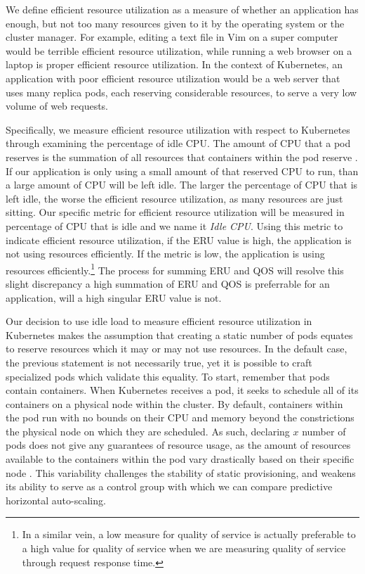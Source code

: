 We define efficient resource utilization as a measure of whether an application
has enough, but not too many resources given to it by the operating system or
the cluster manager. For example, editing a text file in Vim on a super computer
would be terrible efficient resource utilization, while running a web browser on
a laptop is proper efficient resource utilization. In the context of Kubernetes,
an application with poor efficient resource utilization would be a web server
that uses many replica pods, each reserving considerable resources,
to serve a very low volume of web requests.

Specifically, we measure efficient resource utilization with respect to
Kubernetes through examining the percentage of idle CPU.
The amount of CPU that a pod reserves is the summation of
all resources that containers within the pod reserve
\cite{k8s-compute-resources}. If our application is only using a small amount of
that reserved CPU to run, than a large amount of CPU will be left idle. The
larger the percentage of CPU that is left idle, the worse the efficient resource
utilization, as many resources are just sitting. Our specific metric for efficient resource
utilization will be measured in percentage of CPU that is idle and we name it
\textit{Idle CPU}. Using this metric to indicate efficient resource utilization,
if the ERU value is high, the application is not using resources efficiently. If
the metric is low, the application is using resources efficiently.\footnote{In a
similar vein, a low measure for quality of service is actually preferable to a
high value for quality of service when we are measuring quality of service
through request response time.} The process for summing ERU and QOS will resolve
this slight discrepancy a high summation of ERU and QOS is preferrable for an
application, will a high singular ERU value is not.

Our decision to use idle load to measure efficient resource utilization
in Kubernetes makes the assumption that
creating a static number of pods equates to reserve resources which it may or
may not use resources. In the default case, the previous statement is not necessarily true,
yet it is possible to craft specialized pods which validate this equality. To
start, remember that pods contain containers. When Kubernetes receives a pod, it
seeks to schedule all of its containers on a physical node within the cluster.
By default, containers within the pod run with no bounds on their CPU and memory
beyond the constrictions the physical node on which they are scheduled. As such,
declaring $x$ number of pods does not give any guarantees of resource usage, as
the amount of resources available to the containers within the pod vary
drastically based on their specific node \cite{k8s-limit-range}. This variability challenges the
stability of static provisioning, and weakens its ability to serve as a control
group with which we can compare predictive horizontal auto-scaling.

